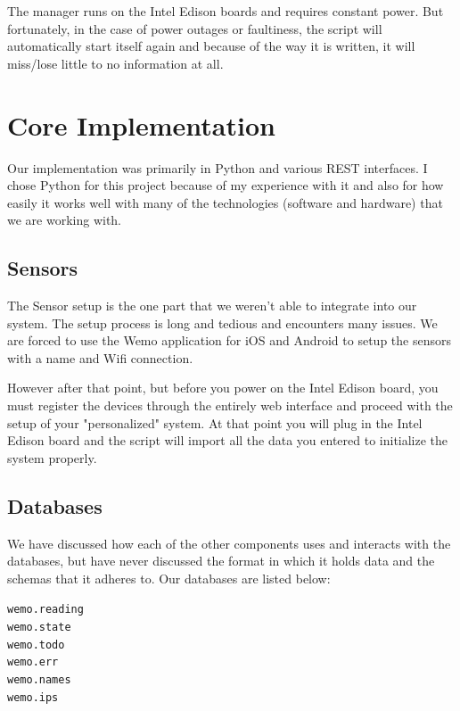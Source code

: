 \documentclass{sig-alternate-05-2015}
\begin{document}
The manager runs on the Intel Edison boards and requires constant power. But fortunately, in the case of power outages or faultiness, the script will automatically start itself again and because of the way it is written, it will miss/lose little to no information at all.

\section{Core Implementation}

Our implementation was primarily in Python and various REST interfaces. I chose Python for this project because of my experience with it and also for how easily it works well with many of the technologies (software and hardware) that we are working with.

\subsection{Sensors}

The Sensor setup is the one part that we weren't able to integrate into our system. The setup process is long and tedious and encounters many issues. We are forced to use the Wemo application for iOS and Android to setup the sensors with a name and Wifi connection.

However after that point, but before you power on the Intel Edison board, you must register the devices through the entirely web interface and proceed with the setup of your "personalized" system. At that point you will plug in the Intel Edison board and the script will import all the data you entered to initialize the system properly.

\subsection{Databases}

We have discussed how each of the other components uses and interacts with the databases, but have never discussed the format in which it holds data and the schemas that it adheres to. Our databases are listed below:
\begin{center}
	\texttt{wemo.reading}\\
	\texttt{wemo.state}\\
	\texttt{wemo.todo}\\
	\texttt{wemo.err}\\
	\texttt{wemo.names}\\
	\texttt{wemo.ips}
\end{center}
\end{document}
